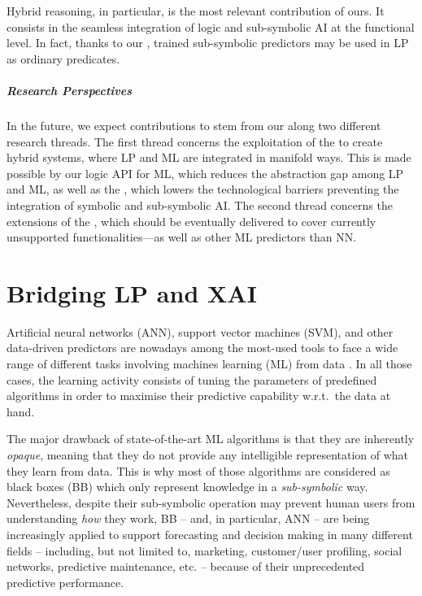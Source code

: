 \documentclass[12pt,a4paper,openright,twoside]{book}
\begin{document}
Hybrid reasoning, in particular, is the most relevant contribution of ours.
%
It consists in the seamless integration of logic and sub-symbolic AI at the functional level.
%
In fact, thanks to our \mllib{}, trained sub-symbolic predictors may be used in LP as ordinary predicates.

\paragraph{Research Perspectives}

In the future, we expect contributions to stem from our \mllib{} along two different research threads.
%
The first thread concerns the exploitation of the \mllib{} to create hybrid systems, where LP and ML are integrated in manifold ways.
%
This is made possible by our logic API for ML, which reduces the abstraction gap among LP and ML, as well as the \mllib, which lowers the technological barriers preventing the integration of symbolic and sub-symbolic AI.
%
The second thread concerns the extensions of the \mllib{}, which should be eventually delivered to cover currently unsupported functionalities---as well as other ML predictors than NN.

\chapter{Bridging LP and XAI}
\label{chap:psyke}


Artificial neural networks (ANN), support vector machines (SVM), and other data-driven predictors are nowadays among the most-used tools to face a wide range of different tasks involving machines learning (ML) from data \cite{rocha2012far}.
%
In all those cases, the learning activity consists of tuning the parameters of predefined algorithms in order to maximise their predictive capability w.r.t.\ the data at hand.

The major drawback of state-of-the-art ML algorithms is that they are inherently \emph{opaque}, meaning that they do not provide any intelligible representation of what they learn from data.
%
This is why most of those algorithms are considered as black boxes (BB) which only represent knowledge in a \emph{sub-symbolic} way.
%
Nevertheless, despite their sub-symbolic operation may prevent human users from understanding \emph{how} they work, BB -- and, in particular, ANN -- are being increasingly applied to support forecasting and decision making in many different fields -- including, but not limited to, marketing, customer/user profiling, social networks, predictive maintenance, etc. -- because of their unprecedented predictive performance.
\end{document}
